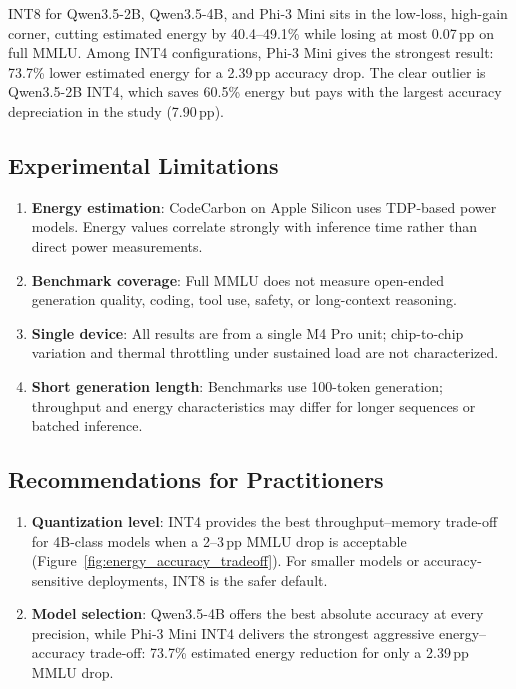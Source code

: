 \documentclass[journal]{IEEEtran}
\begin{document}
INT8 for Qwen3.5-2B, Qwen3.5-4B, and Phi-3 Mini sits in the low-loss, high-gain corner, cutting estimated energy by 40.4--49.1\% while losing at most 0.07\,pp on full MMLU. Among INT4 configurations, Phi-3 Mini gives the strongest result: 73.7\% lower estimated energy for a 2.39\,pp accuracy drop. The clear outlier is Qwen3.5-2B INT4, which saves 60.5\% energy but pays with the largest accuracy depreciation in the study (7.90\,pp).

\subsection{Experimental Limitations}

\begin{enumerate}[leftmargin=*,nosep]
    \item \textbf{Energy estimation}: CodeCarbon on Apple Silicon uses TDP-based power models. Energy values correlate strongly with inference time rather than direct power measurements.

    \item \textbf{Benchmark coverage}: Full MMLU does not measure open-ended generation quality, coding, tool use, safety, or long-context reasoning.

    \item \textbf{Single device}: All results are from a single M4 Pro unit; chip-to-chip variation and thermal throttling under sustained load are not characterized.

    \item \textbf{Short generation length}: Benchmarks use 100-token generation; throughput and energy characteristics may differ for longer sequences or batched inference.
\end{enumerate}

\subsection{Recommendations for Practitioners}

\begin{enumerate}[leftmargin=*,nosep]
    \item \textbf{Quantization level}: INT4 provides the best throughput--memory trade-off for 4B-class models when a 2--3\,pp MMLU drop is acceptable (Figure~\ref{fig:energy_accuracy_tradeoff}). For smaller models or accuracy-sensitive deployments, INT8 is the safer default.

    \item \textbf{Model selection}: Qwen3.5-4B offers the best absolute accuracy at every precision, while Phi-3 Mini INT4 delivers the strongest aggressive energy--accuracy trade-off: 73.7\% estimated energy reduction for only a 2.39\,pp MMLU drop.
\end{enumerate}
\end{document}
